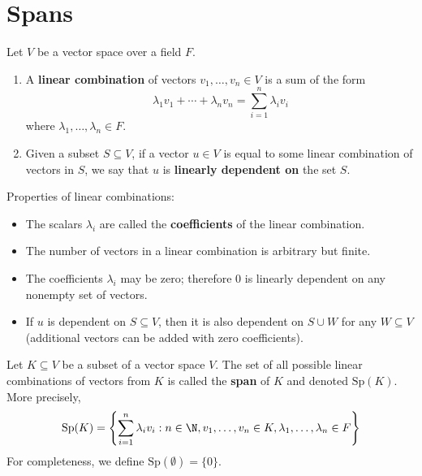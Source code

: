 \section{Spans}
\begin{definition}\label{def:linear-combination}
    Let $V$ be a vector space over a field $F$.
    \begin{enumerate}[label=\roman*.]
        \item A \textbf{linear combination} of vectors $v_1, \ldots, v_n \in V$ is a sum of the form
        \[
        \lambda_1 v_1 + \cdots + \lambda_n v_n = \sum_{i=1}^{n} \lambda_i v_i
        \]
        where $\lambda_1, \ldots, \lambda_n \in F$.
        
        \item Given a subset $S \subseteq V$, if a vector $u \in V$ is equal to some linear combination of vectors in $S$, we say that $u$ is \textbf{linearly dependent on} the set $S$.
    \end{enumerate}
\end{definition}

\begin{note}
    Properties of linear combinations:
    \begin{itemize}
        \item The scalars $\lambda_i$ are called the \textbf{coefficients} of the linear combination.
        \item The number of vectors in a linear combination is arbitrary but finite.
        \item The coefficients $\lambda_i$ may be zero; therefore $0$ is linearly dependent on any nonempty set of vectors.
        \item If $u$ is dependent on $S \subseteq V$, then it is also dependent on $S \cup W$ for any $W \subseteq V$ (additional vectors can be added with zero coefficients).
    \end{itemize}
\end{note}
\newpage
\begin{definition}[Span]\label{def:span}
    Let $K \subseteq V$ be a subset of a vector space $V$. The set of all possible linear combinations of vectors from $K$ is called the \textbf{span} of $K$ and denoted $\mathrm{Sp}(K)$. More precisely,
    \[
    \mathrm{Sp}(K) = \left\{ \sum_{i=1}^{n} \lambda_i v_i : n \in \N, v_1, \ldots, v_n \in K, \lambda_1, \ldots, \lambda_n \in F \right\}
    \]
    For completeness, we define $\mathrm{Sp}(\emptyset) = \{0\}$.
\end{definition}

